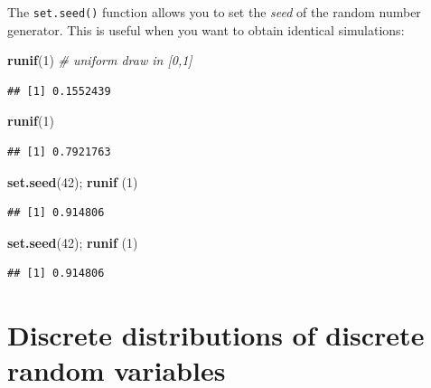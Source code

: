 \documentclass[]{book}
\newenvironment{Shaded}{\begin{snugshade}}{\end{snugshade}}
\newcommand{\CommentTok}[1]{\textcolor[rgb]{0.56,0.35,0.01}{\textit{#1}}}
\newcommand{\DecValTok}[1]{\textcolor[rgb]{0.00,0.00,0.81}{#1}}
\newcommand{\KeywordTok}[1]{\textcolor[rgb]{0.13,0.29,0.53}{\textbf{#1}}}
\newcommand{\NormalTok}[1]{#1}
\begin{document}
The \texttt{set.seed()} function allows you to set the \emph{seed} of the random number generator. This is useful when you want to obtain identical simulations:

\begin{Shaded}
\begin{Highlighting}[]
\KeywordTok{runif}\NormalTok{(}\DecValTok{1}\NormalTok{) }\CommentTok{# uniform draw in [0,1]}
\end{Highlighting}
\end{Shaded}

\begin{verbatim}
## [1] 0.1552439
\end{verbatim}

\begin{Shaded}
\begin{Highlighting}[]
\KeywordTok{runif}\NormalTok{(}\DecValTok{1}\NormalTok{)}
\end{Highlighting}
\end{Shaded}

\begin{verbatim}
## [1] 0.7921763
\end{verbatim}

\begin{Shaded}
\begin{Highlighting}[]
\KeywordTok{set.seed}\NormalTok{(}\DecValTok{42}\NormalTok{); }\KeywordTok{runif}\NormalTok{ (}\DecValTok{1}\NormalTok{)}
\end{Highlighting}
\end{Shaded}

\begin{verbatim}
## [1] 0.914806
\end{verbatim}

\begin{Shaded}
\begin{Highlighting}[]
\KeywordTok{set.seed}\NormalTok{(}\DecValTok{42}\NormalTok{); }\KeywordTok{runif}\NormalTok{ (}\DecValTok{1}\NormalTok{)}
\end{Highlighting}
\end{Shaded}

\begin{verbatim}
## [1] 0.914806
\end{verbatim}

\hypertarget{discrete-distributions-of-discrete-random-variables}{%
\section{Discrete distributions of discrete random variables}\label{discrete-distributions-of-discrete-random-variables}}
\end{document}
